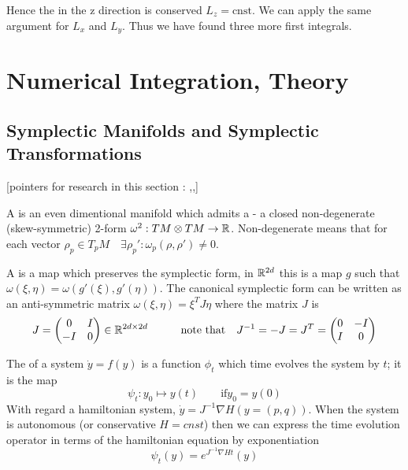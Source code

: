 \documentclass[12pt]{article}
\begin{document}
Hence the  in the z direction is conserved $L_z = \text{cnst}$. We can apply the same argument for $L_x$ and $L_y$. Thus we have found three more first integrals.

\section{Numerical Integration, Theory}


\subsection{Symplectic Manifolds and Symplectic Transformations}
[pointers for research in this section : \cite{Omar},\cite{Numerical},\cite{Duruisseaux}]

A  is an even dimentional manifold which admits a  - a closed non-degenerate (skew-symmetric) 2-form $\omega^2 : TM\otimes TM \to \mathbb{R}$. Non-degenerate means that for each vector $\rho_p\in T_p M\quad \exists \rho_p' : \omega_p(\rho,\rho')\neq 0$. 

A  is a map which preserves the symplectic form, in $\mathbb{R}^{2d}$ this is a map $g$ such that $\omega(\xi,\eta) = \omega(g'(\xi),g'(\eta))$. The canonical symplectic form can be written as an anti-symmetric matrix $\omega(\xi,\eta) = \xi^T J \eta$ where the matrix $J$ is
\begin{equation}\label{eq:matrix J}
    J = \begin{pmatrix} 0 & I\\ -I& 0 \end{pmatrix}\in \mathbb{R}^{2d\times 2d}\qquad\quad \text{note that}\quad J^{-1} = -J = J^T = \begin{pmatrix} 0& -I\\ I&0 \end{pmatrix}
\end{equation}

The  of a system $\dot y = f(y)$ is a function $\phi_t$ which time evolves the system by $t$; it is the map
\begin{equation}\label{eq:flow}\psi_t : y_0\mapsto y(t)\qquad \text{if} y_0 = y(0)\end{equation}
With regard a hamiltonian system, $\dot y = J^{-1}\nabla H(y=(p,q))$. When the system is autonomous (or conservative $H = cnst$) then we can express the time evolution operator in terms of the hamiltonian equation by exponentiation
\begin{equation}\label{eq:time evolution autonomous hamiltonian}
    \psi_t(y) = e^{J^{-1}\nabla H t}(y)
\end{equation}
\end{document}
